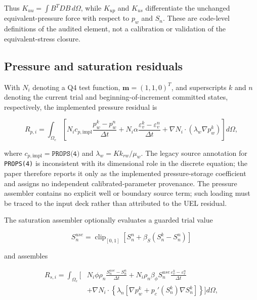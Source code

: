 \documentclass[preprint,12pt,authoryear]{elsarticle}
\begin{document}
Thus $K_{uu}=\int B^TDB\,d\Omega$, while $K_{up}$ and $K_{us}$ differentiate the unchanged equivalent-pressure force with respect to $p_w$ and $S_n$. These are code-level definitions of the audited element, not a calibration or validation of the equivalent-stress closure.

\subsection{Pressure and saturation residuals}

With $N_i$ denoting a Q4 test function, $\mathbf{m}=(1,1,0)^T$, and superscripts $k$ and $n$ denoting the current trial and beginning-of-increment committed states, respectively, the implemented pressure residual is

\begin{equation}
R_{p,i}=\int_{\Omega_e}
\left[
N_i c_{p,\mathrm{impl}}\frac{p_w^k-p_w^n}{\Delta t}
+N_i\alpha\frac{\varepsilon_v^k-\varepsilon_v^n}{\Delta t}
+\nabla N_i\cdot(\lambda_w\nabla p_w^k)
\right]d\Omega,
\end{equation}

where $c_{p,\mathrm{impl}}=\texttt{PROPS(4)}$ and $\lambda_w=Kk_{rw}/\mu_w$. The legacy source annotation for \texttt{PROPS(4)} is inconsistent with its dimensional role in the discrete equation; the paper therefore reports it only as the implemented pressure-storage coefficient and assigns no independent calibrated-parameter provenance. The pressure assembler contains no explicit well or boundary source term; such loading must be traced to the input deck rather than attributed to the UEL residual.

The saturation assembler optionally evaluates a guarded trial value

\begin{equation}
S_n^{use}=\operatorname{clip}_{[0,1]}
\left[S_n^n+\beta_S(S_n^k-S_n^n)\right]
\end{equation}

and assembles

\begin{equation}
\begin{aligned}
R_{s,i}=\int_{\Omega_e}\Bigg[
&N_i\phi\rho_n\frac{S_n^{use}-S_n^n}{\Delta t}
+N_i\rho_n\beta_\phi S_n^{use}
\frac{\varepsilon_v^k-\varepsilon_v^n}{\Delta t}\\
&+\nabla N_i\cdot\left\{\lambda_n
\left[\nabla p_w^k+p_c'(S_n^k)\nabla S_n^k\right]\right\}
\Bigg]d\Omega,
\end{aligned}
\end{equation}
\end{document}
